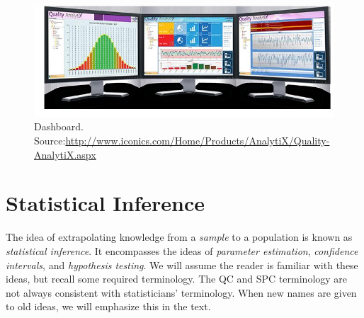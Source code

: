 \documentclass[12pt,a4paper]{report}
\begin{document}
\begin{figure}[h]
\centering
\includegraphics[height=0.3\textheight, width=0.9\linewidth]{art/dashboard}
\caption[Dashboard]{Dashboard. Source:\url{http://www.iconics.com/Home/Products/AnalytiX/Quality-AnalytiX.aspx}}
\label{fig:dashboard}
\end{figure}

\afterpage{\clearpage}


\chapter{Statistical Inference} 
\label{sec:inference}

The idea of extrapolating knowledge from a \emph{sample} to a population is known as \emph{statistical inference}.
It encompasses the ideas of \emph{parameter estimation}, \emph{confidence intervals}, and \emph{hypothesis testing}.
We will assume the reader is familiar with these ideas, but recall some required terminology.
The QC and SPC terminology are not always consistent with statisticians' terminology. When new names are given to old ideas, we will emphasize this in the text.
\end{document}
